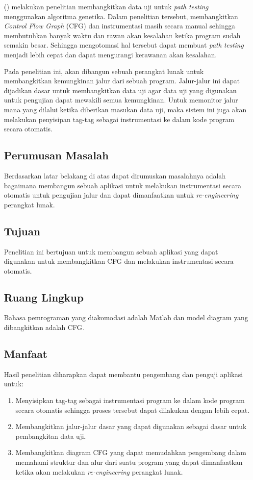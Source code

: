 \citeauthor{HERMADI2015} (\cite*{HERMADI2015}) melakukan penelitian membangkitkan data uji untuk \textit{path testing} menggunakan algoritma genetika. Dalam penelitian tersebut, \citeauthor{HERMADI2015} membangkitkan \textit{Control Flow Graph} (CFG) dan instrumentasi masih secara manual sehingga membutuhkan banyak waktu dan rawan akan kesalahan ketika program sudah semakin besar. Sehingga mengotomasi hal tersebut dapat membuat \textit{path testing} menjadi lebih cepat dan dapat mengurangi kerawanan akan kesalahan.

Pada penelitian ini, akan dibangun sebuah perangkat lunak untuk membangkitkan kemungkinan jalur dari sebuah program. Jalur-jalur ini dapat dijadikan dasar untuk membangkitkan data uji agar data uji yang digunakan untuk pengujian dapat mewakili semua kemungkinan. Untuk memonitor jalur mana yang dilalui ketika diberikan masukan data uji, maka sistem ini juga akan melakukan penyisipan tag-tag sebagai instrumentasi ke dalam kode program secara otomatis.

\subsection*{Perumusan Masalah}
Berdasarkan latar belakang di atas dapat dirumuskan masalahnya adalah bagaimana membangun sebuah aplikasi untuk melakukan instrumentasi secara otomatis untuk pengujian jalur dan dapat dimanfaatkan untuk \textit{re-engineering} perangkat lunak.

\subsection*{Tujuan}
Penelitian ini bertujuan untuk membangun sebuah aplikasi yang dapat digunakan untuk membangkitkan CFG dan melakukan instrumentasi secara otomatis.

\subsection*{Ruang Lingkup}
Bahasa pemrograman yang diakomodasi adalah Matlab dan model diagram yang dibangkitkan adalah CFG.

\subsection*{Manfaat}
Hasil penelitian diharapkan dapat membantu pengembang dan penguji aplikasi untuk:
\begin{enumerate}[noitemsep] 
\item Menyisipkan tag-tag sebagai instrumentasi program ke dalam kode program secara otomatis sehingga proses tersebut dapat dilakukan dengan lebih cepat.
\item Membangkitkan jalur-jalur dasar yang dapat digunakan sebagai dasar untuk pembangkitan data uji.
\item Membangkitkan diagram CFG yang dapat memudahkan pengembang dalam memahami struktur dan alur dari suatu program yang dapat dimanfaatkan ketika akan melakukan \textit{re-engineering} perangkat lunak.
\end{enumerate}

